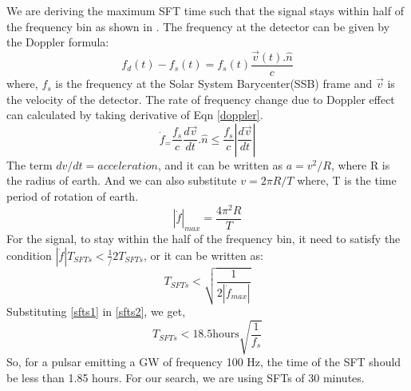 \documentclass{ttuthes2007}
\begin{document}
We are deriving the maximum \ac{SFT} time such that the signal stays within half
of the frequency bin as shown in \citet{Krishnan_2004}. The frequency at the detector can be given by the Doppler formula:
\begin{equation}
\label{doppler}
f_d(t) - f_s(t) = f_s(t)\frac{\vec{v}(t).\hat{n}}{c}
\end{equation}
where, $f_s$ is the frequency at the Solar System Barycenter(SSB) frame and
$\vec{v}$ is the velocity of the detector.
The rate of frequency change due to Doppler effect can calculated by taking
derivative of Eqn \ref{doppler}.
\begin{equation}
\dot{f}_= \frac{f_s}{c}\frac{d\vec{v}}{dt}.\hat{n} \leq
\frac{f_s}{c}\left|\frac{d\vec{v}}{dt}\right|
\end{equation}
The term $dv/dt=acceleration$, and it can be written as $a=v^2/R$, where R is
the radius of earth. And we can also substitute $v=2\pi R/T$ where, T is the time
period of rotation of earth.
\begin{equation}\label{sfts1}
|\dot{f}|_{max}= \frac{4\pi^2R}{T}
\end{equation}
For the signal, to stay within the half of the frequency bin, it need to satisfy
the condition $|\dot{f}|T_{SFTs} < \frac{1}/{2T_{SFTs}}$, or it can be written as:
\begin{equation}\label{sfts2}
T_{SFTs}<\sqrt{\frac{1}{2|\dot{f}_{max}|}}
\end{equation}
Substituting \ref{sfts1} in \ref{sfts2}, we get,
\begin{equation}
T_{SFTs} < 18.5 \text{hours}\sqrt{\frac{1}{f_s}}
\end{equation}
So, for a pulsar emitting a \ac{GW} of frequency 100 Hz, the time of the
\ac{SFT} should be less than 1.85 hours. For our search, we are using \acp{SFT} of 30 minutes.
\end{document}
